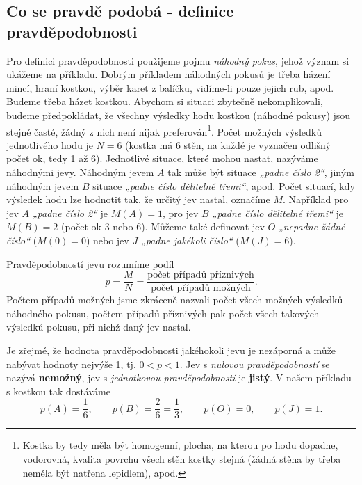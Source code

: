     \subsection{Co se pravdě podobá - definice pravděpodobnosti}
      Pro definici pravděpodobnosti použijeme pojmu \emph{náhodný pokus}, jehož význam si ukážeme 
      na příkladu. Dobrým příkladem náhodných pokusů je třeba házení mincí, hraní kostkou, výběr 
      karet z balíčku, vidíme-li pouze jejich rub, apod. Budeme třeba házet kostkou. Abychom si 
      situaci zbytečně nekomplikovali, budeme předpokládat, že všechny výsledky hodu kostkou 
      (náhodné pokusy) jsou stejně časté, žádný z nich není nijak preferován\footnote{Kostka by 
      tedy měla být homogenní, plocha, na kterou po hodu dopadne, vodorovná, kvalita povrchu všech 
      stěn kostky stejná (žádná stěna by třeba neměla být natřena lepidlem), apod.}. Počet možných 
      výsledků jednotlivého hodu je \(N = 6\) (kostka má \num{6} stěn, na každé je vyznačen odlišný 
      počet ok, tedy \num{1} až \num{6}). Jednotlivé situace, které mohou nastat, nazýváme 
      náhodnými jevy. Náhodným jevem \(A\) tak může být situace \emph{„padne číslo \num{2}“}, jiným 
      náhodným jevem \(B\) situace \emph{„padne číslo dělitelné třemi“}, apod. Počet situací, kdy 
      výsledek hodu lze hodnotit tak, že určitý jev nastal, označíme \(M\). Například pro jev \(A\) 
      \emph{„padne číslo \num{2}“} je \(M(A)= 1\), pro jev \(B\) \emph{„padne číslo dělitelné 
      třemi“} je \(M(B) = 2\) (počet ok \num{3} nebo \num{6}). Můžeme také definovat jev \(O\) 
      \emph{„nepadne žádné číslo“} (\(M(0) = 0\)) nebo jev \(J\) \emph{„padne jakékoli číslo“} 
      (\(M(J) = 6\)).
      
      \begin{definition}
        Pravděpodobností jevu rozumíme podíl
        \begin{equation}\label{mai:eq011}
          p = \frac{M}{N} = \frac{\text{počet případů příznivých}}{\text{počet případů možných}}.
        \end{equation}  
        Počtem případů možných jsme zkráceně nazvali počet všech možných výsledků náhodného 
        pokusu, počtem případů příznivých pak počet všech takových výsledků pokusu, při nichž daný 
        jev nastal.
      \end{definition}
      Je zřejmé, že hodnota pravděpodobnosti jakéhokoli jevu je nezáporná a může nabývat hodnoty 
      nejvýše \num{1}, tj. \(0 <p< 1\). Jev s \emph{nulovou pravděpodobností} se nazývá 
      \textbf{nemožný}, jev s \emph{jednotkovou pravděpodobností} je \textbf{jistý}. V našem 
      příkladu s kostkou tak dostáváme
      \begin{equation*}
        p(A) = \frac{1}{6}, \qquad p(B) = \frac{2}{6} = \frac{1}{3}, \qquad
        p(O) = 0, \qquad p(J) = 1.
      \end{equation*}  


